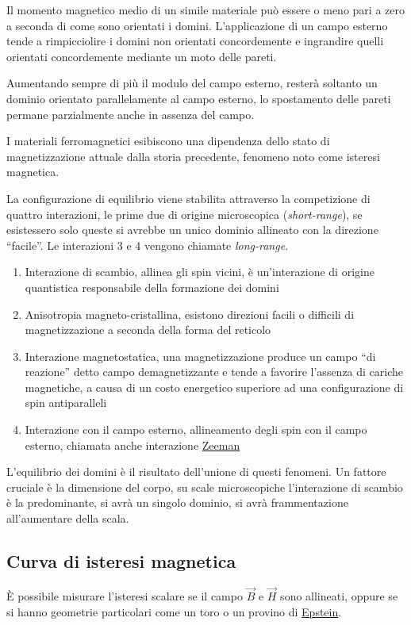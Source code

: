 Il momento magnetico medio di un simile materiale può essere o meno pari a zero
a seconda di come sono orientati i domini. L'applicazione di un campo esterno tende
a rimpicciolire i domini non orientati concordemente e ingrandire quelli orientati
concordemente mediante un moto delle pareti.

Aumentando sempre di più il modulo del campo esterno, resterà soltanto un dominio orientato
parallelamente al campo esterno, lo spostamento delle pareti permane parzialmente
anche in assenza del campo.

I materiali ferromagnetici esibiscono una dipendenza dello stato di magnetizzazione
attuale dalla storia precedente, fenomeno noto come isteresi magnetica.

\newpage
La configurazione di equilibrio viene stabilita attraverso la competizione di quattro 
interazioni, le prime due di origine microscopica (\textit{short-range}), se esistessero
solo queste si avrebbe un unico dominio allineato con la direzione ``facile''. Le 
interazioni 3 e 4 vengono chiamate \textit{long-range}.
\begin{enumerate}
\item Interazione di scambio, allinea gli spin vicini, è un'interazione di origine quantistica responsabile della formazione dei domini
\item Anisotropia magneto-cristallina, esistono direzioni facili o difficili di magnetizzazione a seconda della forma del reticolo
\item Interazione magnetostatica, una magnetizzazione produce un campo ``di reazione'' 
detto campo demagnetizzante e tende a favorire l'assenza di cariche magnetiche, a causa
di un costo energetico superiore ad una configurazione di spin antiparalleli
\item Interazione con il campo esterno, allineamento degli spin con il campo esterno, 
chiamata anche interazione \href{https://it.wikipedia.org/wiki/Effetto_Zeeman}{Zeeman}
\end{enumerate}
L'equilibrio dei domini è il risultato dell'unione di questi fenomeni. Un fattore cruciale
è la dimensione del corpo, su scale microscopiche l'interazione di scambio è la 
predominante, si avrà un singolo dominio, si avrà frammentazione all'aumentare della scala.

\subsection{Curva di isteresi magnetica}
È possibile misurare l'isteresi scalare se il campo $\vec{B}$ e $\vec{H}$ sono allineati,
oppure se si hanno geometrie particolari come un toro o un provino di \href{https://en.wikipedia.org/wiki/Epstein_frame}{Epstein}. 

